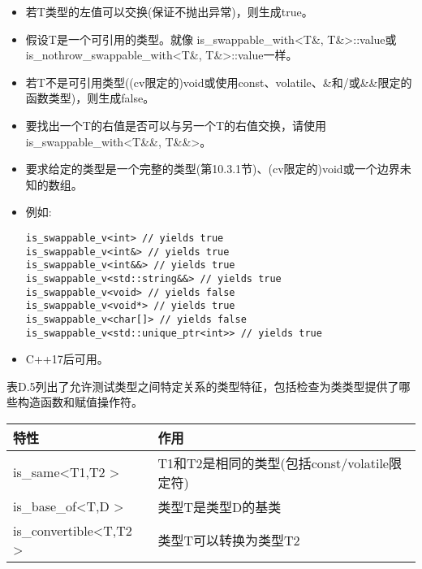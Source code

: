 \begin{itemize}
\item
若T类型的左值可以交换(保证不抛出异常)，则生成true。

\item
假设T是一个可引用的类型。就像 is\_swappable\_with<T\&, T\&>::value或is\_nothrow\_swappable\_with<T\&, T\&>::value一样。

\item
若T不是可引用类型((cv限定的)void或使用const、volatile、\&和/或\&\&限定的函数类型)，则生成false。

\item
要找出一个T的右值是否可以与另一个T的右值交换，请使用is\_swappable\_with<T\&\&, T\&\&>。

\item
要求给定的类型是一个完整的类型(第10.3.1节)、(cv限定的)void或一个边界未知的数组。

\item
例如:
\begin{lstlisting}[style=styleCXX]
is_swappable_v<int> // yields true
is_swappable_v<int&> // yields true
is_swappable_v<int&&> // yields true
is_swappable_v<std::string&&> // yields true
is_swappable_v<void> // yields false
is_swappable_v<void*> // yields true
is_swappable_v<char[]> // yields false
is_swappable_v<std::unique_ptr<int>> // yields true
\end{lstlisting}

\item
C++17后可用。
\end{itemize}


表D.5列出了允许测试类型之间特定关系的类型特征，包括检查为类类型提供了哪些构造函数和赋值操作符。

\begin{table}[H]
	\begin{center}
	\begin{tabular}{l|l}
		\hline
		\textbf{特性}                                & \textbf{作用}                                                    \\ \hline
		is\_same\textless{}T1,T2 \textgreater{}       & T1和T2是相同的类型(包括const/volatile限定符)\\ \hline
		is\_base\_of\textless{}T,D \textgreater{}     & 类型T是类型D的基类                                     \\ \hline
		is\_convertible\textless{}T,T2 \textgreater{} & 类型T可以转换为类型T2                                 \\ \hline
	\end{tabular}
	\end{center}
\end{table}

